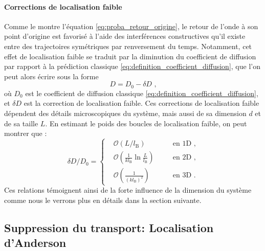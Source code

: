 \paragraph*{Corrections de localisation faible}
Comme le montre l'équation \ref{eq:proba_retour_origine}, le retour de l'onde à son point d'origine est favorisé à l'aide des interférences constructives qu'il existe entre des trajectoires symétriques par renversement du temps. Notamment, cet effet de localisation faible se traduit par la diminution du coefficient de diffusion par rapport à la prédiction classique \ref{eq:definition_coefficient_diffusion}, que l'on peut alors écrire sous la forme
\begin{equation}
D= D_{\mathrm{0}}-\delta D \text{ ,}
\end{equation}
où $D_{\mathrm{0}}$ est le coefficient de diffusion classique \ref{eq:definition_coefficient_diffusion}, et $\delta D$ est la correction de localisation faible. Ces corrections de localisation faible dépendent des détails microscopiques du système, mais aussi de sa dimension $d$ et de sa taille $L$. En estimant le poids des boucles de localisation faible, on peut montrer que \citep{akkermans2007mesoscopic}:
\begin{equation}
\delta D/ D_{\mathrm{0}} = \left\lbrace \begin{aligned}
& \mathcal{O}\left(L/l_{\mathrm{B}}\right)  \quad &&\text{en 1D ,}\\
& \mathcal{O}\left(\frac{1}{k l_{\mathrm{B}}} \ln{\frac{L}{l_{\mathrm{B}}}} \right) \quad &&\text{en 2D ,}\\
& \mathcal{O}\left(\frac{1}{(k l_{\mathrm{B}})^2}\right) \quad &&\text{en 3D .}
\end{aligned}\right.
\label{eq:correction_localisation_faible}
\end{equation}
Ces relations témoignent ainsi de la forte influence de la dimension du système comme nous le verrons plus en détails dans la section suivante.






\subsection{Suppression du transport: Localisation d'Anderson}
\label{sc:localisation_anderson}

